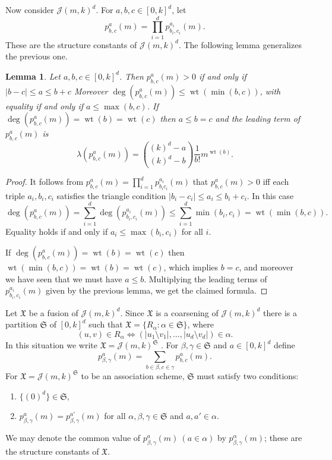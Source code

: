 \documentclass[10pt]{article}
\newtheorem{lemma}[theorem]{Lemma}
\newcommand{\cJ}{{\mathcal J}}
\newcommand{\fS}{\mathfrak S}
\newcommand{\wt}{\operatorname{wt}}
\def\X{\mathfrak{X}}
\begin{document}
Now consider $\cJ(m, k)^d$.
For $a, b, c \in [0,k]^d$, let
\[
    p^a_{b,c}(m) = \prod_{i=1}^d p^{a_i}_{b_i,c_i}(m).
\]
These are the structure constants of $\cJ(m, k)^d$.
The following lemma generalizes the previous one.

\begin{lemma}
    Let $a,b,c\in[0,k]^d$.
    Then $p^a_{b,c}(m) > 0$ if and only if $|b-c| \leq a \leq b + c$
    Moreover $\deg(p_{b,c}^a(m)) \leq \wt(\min(b, c))$, with equality if and only if $a \leq \max(b, c)$.
    If~$\deg(p_{b,c}^a(m)) = \wt(b) = \wt(c)$ then $a \leq b = c$ and the leading term of $p^a_{b,c}(m)$ is
    \[
        \lambda(p^a_{b,c}(m))
        = \binom{(k)^d - a}{(k)^d - b} \frac{1}{b!} m^{\wt(b)}.
    \]
\end{lemma}
\begin{proof}
    It follows from $p_{b,c}^a(m) = \prod_{i=1}^d p_{b_i c_i}^{a_i}(m)$ that $p_{b,c}^a(m)>0$ iff each triple $a_i,b_i,c_i$ satisfies the triangle condition $|b_i-c_i|\leq a_i \leq b_i+c_i$. In this case
    \[
        \deg(p_{b,c}^a(m)) = \sum_{i=1}^d \deg(p_{b_i, c_i}^{a_i}(m))\leq \sum_{i=1}^d\min(b_i,c_i) = \wt(\min(b, c)).
    \]
    Equality holds if and only if $a_i \leq \max(b_i, c_i)$ for all $i$.
    
    If $\deg(p_{b,c}^a(m)) = \wt(b) = \wt(c)$ then $\wt(\min(b, c)) = \wt(b) = \wt(c)$, which implies $b = c$, and moreover we have seen that we must have $a \leq b$.
    Multiplying the leading terms of $p^{a_i}_{b_i,c_i}(m)$ given by the previous lemma, we get the claimed formula.
\end{proof}


Let $\X$ be a fusion of $\cJ(m, k)^d$.
Since $\X$ is a coarsening of $\cJ(m, k)^d$ there is a partition $\fS$ of $[0,k]^d$ such that $\X = \{R_\alpha : \alpha \in \fS\}$, where
\[
    (u, v) \in R_\alpha \iff (|u_1 \setminus v_1|, \dots, |u_d \setminus v_d|) \in \alpha.
\]
In this situation we write $\X = \cJ(m, k)^\fS$ \cite[Section~4]{E}.
For $\beta, \gamma \in \fS$ and $a \in [0,k]^d$ define
\[
    p^a_{\beta,\gamma}(m) = \sum_{b\in \beta, c \in \gamma} p^a_{b,c}(m).
\]
For $\X = \cJ(m,k)^\fS$ to be an association scheme, $\fS$ must satisfy two conditions:
\begin{enumerate}
    \item $\{(0)^d\} \in \fS$,
    \item $p^a_{\beta,\gamma}(m) = p^{a'}_{\beta,\gamma}(m)$ for all $\alpha,\beta,\gamma \in \fS$ and $a,a' \in \alpha$.
\end{enumerate}
We may denote the common value of $p^a_{\beta,\gamma}(m) ~ (a\in\alpha)$ by $p^\alpha_{\beta,\gamma}(m)$; these are the structure constants of $\X$.
\end{document}

